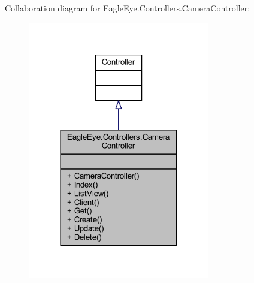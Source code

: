 Collaboration diagram for Eagle\+Eye.\+Controllers.\+Camera\+Controller\+:\nopagebreak
\begin{figure}[H]
\begin{center}
\leavevmode
\includegraphics[width=225pt]{class_eagle_eye_1_1_controllers_1_1_camera_controller__coll__graph}
\end{center}
\end{figure}
